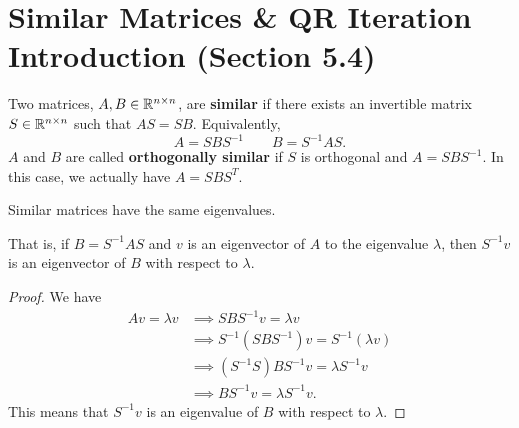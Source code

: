 \documentclass[letterpaper]{article}
\newcommand{\0}{\mathbf{0}}
\begin{document}
\section{Similar Matrices \& QR Iteration Introduction (Section 5.4)}
Two matrices, $A, B \in \mathbb{R}^{n \times n}$, are \textbf{similar} if there exists an invertible matrix $S \in \mathbb{R}^{n \times n}$ such that $AS = SB$. Equivalently, \[A = SBS^{-1} \qquad B = S^{-1}AS.\]
$A$ and $B$ are called \textbf{orthogonally similar} if $S$ is orthogonal and $A = SBS^{-1}$. In this case, we actually have $A = SBS^T$. 

\begin{theorem}{}{}
    Similar matrices have the same eigenvalues. 
\end{theorem}
That is, if $B = S^{-1}AS$ and $v$ is an eigenvector of $A$ to the eigenvalue $\lambda$, then $S^{-1} v$ is an eigenvector of $B$ with respect to $\lambda$. 

\begin{proof}
    We have 
    \begin{equation}
        \begin{aligned}
            Av = \lambda v &\implies SBS^{-1}v = \lambda v \\ 
                &\implies S^{-1} (SBS^{-1})v = S^{-1}(\lambda v) \\ 
                &\implies (S^{-1} S)BS^{-1}v = \lambda S^{-1}v \\
                &\implies BS^{-1}v = \lambda S^{-1} v.
        \end{aligned}
    \end{equation}
    This means that $S^{-1}v$ is an eigenvalue of $B$ with respect to $\lambda$. 
\end{proof}
\end{document}
